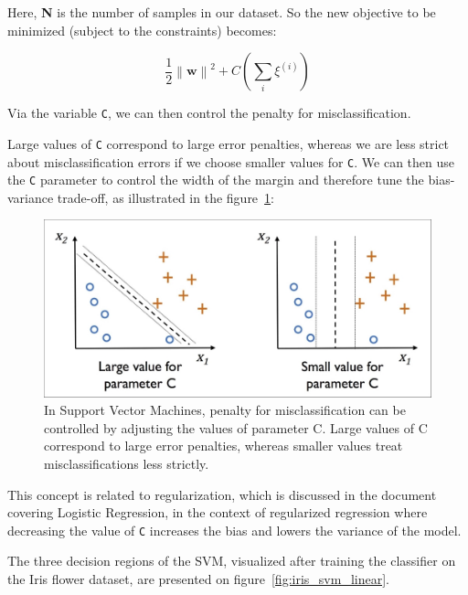 \documentclass[11pt]{article}
\newcommand{\norm}[1]{\left\lVert#1\right\rVert}
\newcommand{\vect}[1]{\boldsymbol{#1}}
\begin{document}
    Here, \textbf{N} is the number of samples in our dataset.
    So the new objective to be minimized (subject to the constraints) becomes:

    \begin{equation}
        \label{eq:svm_margin_reciprocal_slack}
        \frac{1} {2} \norm{\vect{w}}^2 + C \left( \sum \limits_i \xi^{(i)} \right)
    \end{equation}

    Via the variable \texttt{C}, we can then control the penalty for misclassification.

    Large values of \texttt{C} correspond to large error penalties, whereas we are less strict about
    misclassification errors if we choose smaller values for \texttt{C}.
    We can then use the \texttt{C} parameter to control the width of the margin and therefore tune the
    bias-variance trade-off, as illustrated in the figure~\ref{fig:svm_c}:

    \begin{figure}[hbt!]
        \centering
        \includegraphics[width=1\linewidth,trim=4 4 4 4,clip]{img/svm_c.jpg}
        \caption{In Support Vector Machines, penalty for misclassification can be controlled by adjusting the values
        of parameter C. Large values of C correspond to large error penalties, whereas smaller values treat
        misclassifications less strictly.}
        \label{fig:svm_c}
    \end{figure}

    This concept is related to regularization, which is discussed in the document covering Logistic Regression,
    in the context of regularized regression where decreasing the value of \texttt{C} increases the bias and lowers the
    variance of the model.

    The three decision regions of the SVM, visualized after training the classifier on the Iris flower dataset, are presented on figure~\ref{fig:iris_svm_linear}.
\end{document}
